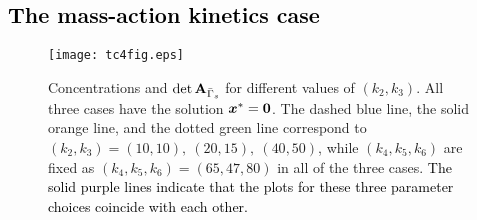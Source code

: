 \documentclass[ amsmath,amssymb,nofootinbib
]{revtex4-1}
\def\mbf#1{\mbox{\boldmath $#1$}}
\newcommand{\detA}{{\rm det}\,  {\bf A}}
\newcommand{\gs}{{\Gamma_s}}
\newcommand{\gbs}{{\bar{\Gamma}_s}}
\newcommand{\red}[1]{\textcolor{black}{#1}}
\newcommand{\corr}[1]{\textcolor{black}{#1}}
\newcommand{\TO}[1]{\textcolor{black}{#1}}
\begin{document}
\subsection{\red{The mass-action kinetics case}}
\begin{figure}[htbp]
\center
\texttt{[image: tc4fig.eps]}
\caption{Concentrations and $\detA_{\bar{\Gamma}_s}$ for different values of $(k_2,k_3)$.  %
All  three cases have the solution ${\mbf x}^*={\mbf 0}$. The dashed blue line, the solid orange line, and the dotted green line correspond to $(k_2,k_3)=(10,10),\ (20,15),\ (40,50)$, while
$(k_4,k_5,k_6)$ are fixed as $(k_4,k_5,k_6)$$=(65, 47, 80)$ in all of the three cases. 
\corr{The solid purple lines indicate that the plots for  these three parameter choices coincide with each other.}
}
\label{fig:trans}
\end{figure}
%
\end{document}
